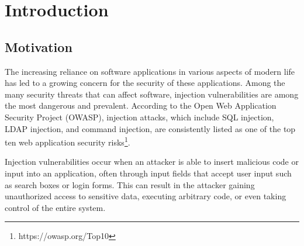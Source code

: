 \chapter{Introduction}
\label{chapter:introduction}

\begin{comment}
	Your introduction goes here
	\begin{itemize}
		\item Generic description of the broad field of research
		\item Current state of research
		\item What's the gap that you're trying to fill?
		\item Short motivation
		\item Summary of the most important results
		\item Your contribution
		\item Structure of the thesis
	\end{itemize}
	
	1-2.5 pages
	
	This text is not too detailed. Start quite high-level, then narrow down until
	you reach your topic. After the introduction, the reader must want to read the
	rest of your thesis and understand the relevance. However, it doesn't have to
	be super technical.
\end{comment}

\section{Motivation}

The increasing reliance on software applications in various aspects of modern life has led to a growing concern for the security of these applications. Among the many security threats that can affect software, injection vulnerabilities are among the most dangerous and prevalent. According to the Open Web Application Security Project (OWASP), injection attacks, which include SQL injection, LDAP injection, and command injection, are consistently listed as one of the top ten web application security risks\footnote{https://owasp.org/Top10}.

Injection vulnerabilities occur when an attacker is able to insert malicious code or input into an application, often through input fields that accept user input such as search boxes or login forms. This can result in the attacker gaining unauthorized access to sensitive data, executing arbitrary code, or even taking control of the entire system.

